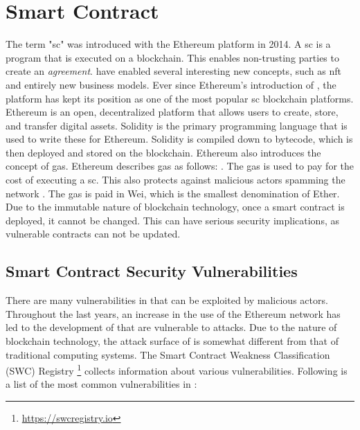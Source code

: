 
\section{Smart Contract}
\label{sec:smart-contract}
The term "\acrlong{sc}" was introduced with the Ethereum platform in 2014. A \acrfull{sc} is a program that is executed on a blockchain. This enables non-trusting parties to create an \textit{agreement}.  have enabled several interesting new concepts, such as \acrfull{nft} and entirely new business models. Ever since Ethereum's introduction of , the platform has kept its position as one of the most popular \acrshort{sc} blockchain platforms. Ethereum is an open, decentralized platform that allows users to create, store, and transfer digital assets. Solidity is the primary programming language that is used to write these  for Ethereum. Solidity is compiled down to bytecode, which is then deployed and stored on the blockchain. Ethereum also introduces the concept of gas. Ethereum describes gas as follows: . The gas is used to pay for the cost of executing a \acrshort{sc}. This also protects against malicious actors spamming the network \cite{ethereum2021gas}. The gas is paid in Wei, which is the smallest denomination of Ether. Due to the immutable nature of blockchain technology, once a smart contract is deployed, it cannot be changed. This can have serious security implications, as vulnerable contracts can not be updated.

\subsection{Smart Contract Security Vulnerabilities}
\label{sec:smart-contract-vulnerabilities}
There are many vulnerabilities in  that can be exploited by malicious actors. Throughout the last years, an increase in the use of the Ethereum network has led to the development of  that are vulnerable to attacks. Due to the nature of blockchain technology, the attack surface of  is somewhat different from that of traditional computing systems. The Smart Contract Weakness Classification (SWC) Registry \footnote{\url{https://swcregistry.io}} collects information about various vulnerabilities. Following is a list of the most common vulnerabilities in :

